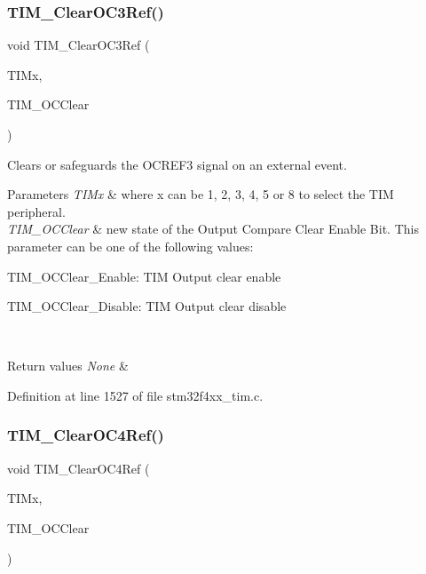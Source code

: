\subsubsection{\texorpdfstring{T\+I\+M\+\_\+\+Clear\+O\+C3\+Ref()}{TIM\_ClearOC3Ref()}}
{\footnotesize\ttfamily void T\+I\+M\+\_\+\+Clear\+O\+C3\+Ref (\begin{DoxyParamCaption}\item[{\hyperlink{struct_t_i_m___type_def}{T\+I\+M\+\_\+\+Type\+Def} $\ast$}]{T\+I\+Mx,  }\item[{uint16\+\_\+t}]{T\+I\+M\+\_\+\+O\+C\+Clear }\end{DoxyParamCaption})}



Clears or safeguards the O\+C\+R\+E\+F3 signal on an external event. 


\begin{DoxyParams}{Parameters}
{\em T\+I\+Mx} & where x can be 1, 2, 3, 4, 5 or 8 to select the T\+IM peripheral. \\
\hline
{\em T\+I\+M\+\_\+\+O\+C\+Clear} & new state of the Output Compare Clear Enable Bit. This parameter can be one of the following values\+: \begin{DoxyItemize}
\item T\+I\+M\+\_\+\+O\+C\+Clear\+\_\+\+Enable\+: T\+IM Output clear enable \item T\+I\+M\+\_\+\+O\+C\+Clear\+\_\+\+Disable\+: T\+IM Output clear disable \end{DoxyItemize}
\\
\hline
\end{DoxyParams}

\begin{DoxyRetVals}{Return values}
{\em None} & \\
\hline
\end{DoxyRetVals}


Definition at line 1527 of file stm32f4xx\+\_\+tim.\+c.

\mbox{\label{group___t_i_m___group2_gaeee5fa66b26e7c6f71850272dc3028f3}} 
\subsubsection{\texorpdfstring{T\+I\+M\+\_\+\+Clear\+O\+C4\+Ref()}{TIM\_ClearOC4Ref()}}
{\footnotesize\ttfamily void T\+I\+M\+\_\+\+Clear\+O\+C4\+Ref (\begin{DoxyParamCaption}\item[{\hyperlink{struct_t_i_m___type_def}{T\+I\+M\+\_\+\+Type\+Def} $\ast$}]{T\+I\+Mx,  }\item[{uint16\+\_\+t}]{T\+I\+M\+\_\+\+O\+C\+Clear }\end{DoxyParamCaption})}



